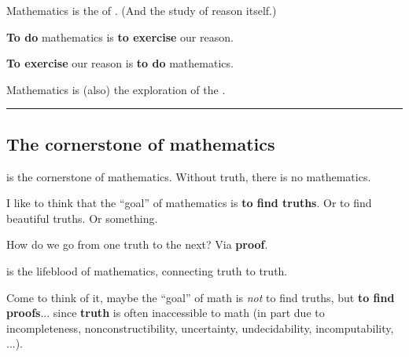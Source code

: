 Mathematics is the  of . (And the study of reason itself.) \par

\vs
{\bf To do} mathematics is {\bf to exercise} our reason. \par
{\bf To exercise} our reason is {\bf to do} mathematics. \par

\vs
Mathematics is (also) the exploration of the .



\vs\hrule\vskip1pt
\subsection{\bf The cornerstone of mathematics}

 is the cornerstone of mathematics. Without truth, there is no mathematics. \par

\vs
I like to think that the ``goal'' of mathematics is {\bf to find truths}. Or to find beautiful truths. Or something. \par
How do we go from one truth to the next? Via {\bf proof}. \par

\vs
{} is the lifeblood of mathematics, connecting truth to truth. \par  %

\vs
Come to think of it, maybe the ``goal'' of math is {\it not} to find truths, but {\bf to find proofs}...
since {\bf truth} is often inaccessible to math (in part due to incompleteness, nonconstructibility, uncertainty, undecidability, incomputability, ...). \par
{}

